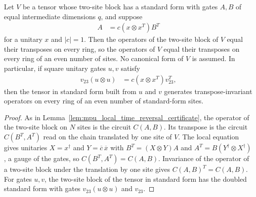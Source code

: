 \begin{lemma}
    \label{lem:mpu_local_transposition_certificate}
    \leanok
    Let $V$ be a tensor whose two-site block has a standard form with gates
    $A,B$ of equal intermediate dimensions $q$, and suppose
    \begin{align}
        A & =c(x\otimes x^T)B^T
    \end{align}
    for a unitary $x$ and $|c|=1$. Then the operators of the two-site block of
    $V$ equal their transposes on every ring, so the operators of $V$ equal
    their transposes on every ring of an even number of sites. No canonical
    form of $V$ is assumed. In particular, if square unitary gates $u,v$
    satisfy
    \begin{align}
        v_{23}(u\otimes u) & =c(x\otimes x^T)v_{23}^T,
    \end{align}
    then the tensor in standard form built from $u$ and $v$ generates
    transpose-invariant operators on every ring of an even number of
    standard-form sites.
\end{lemma}

\begin{proof}\leanok
    As in Lemma~\ref{lem:mpu_local_time_reversal_certificate}, the operator of
    the two-site block on $N$ sites is the circuit $C(A,B)$. Its transpose is
    the circuit $C(B^T,A^T)$ read on the chain translated by one site of $V$.
    The local equation gives unitaries $X=x^\dagger$ and $Y=\overline c\,\overline x$
    with $B^T=(X\otimes Y)A$ and $A^T=B(Y^\dagger\otimes X^\dagger)$, a gauge of
    the gates, so $C(B^T,A^T)=C(A,B)$. Invariance of the operator of a two-site
    block under the translation by one site gives $C(A,B)^T=C(A,B)$. For gates
    $u,v$, the two-site block of the tensor in standard form has the doubled
    standard form with gates $v_{23}(u\otimes u)$ and $v_{23}$.
\end{proof}

